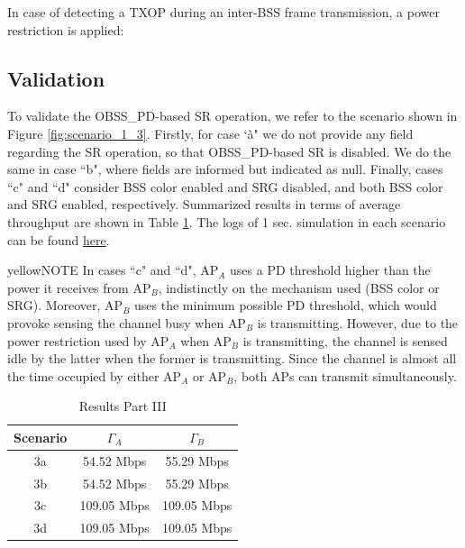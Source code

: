 \documentclass[]{article}
\begin{document}
	In case of detecting a TXOP during an inter-BSS frame transmission, a power restriction is applied:
		
	\subsection{Validation}
	
	To validate the OBSS\_PD-based SR operation, we refer to the scenario shown in Figure \ref{fig:scenario_1_3}. Firstly, for case `à" we do not provide any field regarding the SR operation, so that OBSS\_PD-based SR is disabled. We do the same in case ``b", where fields are informed but indicated as null. Finally, cases ``c" and ``d" consider BSS color enabled and SRG disabled, and both BSS color and SRG enabled, respectively. Summarized results in terms of average throughput are shown in Table \ref{tbl:results_part_3}. The logs of 1 sec. simulation in each scenario can be found \href{https://bitbucket.org/fwilhelmi/towards_centralized_spatial_reuse/src/master/IEEE\%20802.11ax\%20SR\%20implementation/Validations/3.\%20OBSS_PD\%20SR/}{here}. 
	
	\begin{mybox}{yellow}{NOTE}
		In cases ``c" and ``d", $\text{AP}_A$ uses a PD threshold higher than the power it receives from 	$\text{AP}_B$, indistinctly on the mechanism used (BSS color or SRG). Moreover, $\text{AP}_B$ uses the minimum possible PD threshold, which would provoke sensing the channel busy when $\text{AP}_B$ is transmitting. However, due to the power restriction used by $\text{AP}_A$ when $\text{AP}_B$ is transmitting, the channel is sensed idle by the latter when the former is transmitting. Since the channel is almost all the time occupied by either $\text{AP}_A$ or $\text{AP}_B$, both APs can transmit simultaneously.
	\end{mybox}	
	
	\begin{table}[]
		\centering
		\begin{tabular}{|c|c|c|}
			\hline
			\textbf{Scenario} & \textbf{$\Gamma_A$} & \textbf{$\Gamma_B$} \\ \hline
			3a & 54.52 Mbps & 55.29 Mbps  \\ \hline
			3b & 54.52 Mbps & 55.29 Mbps \\ \hline
			3c &  109.05 Mbps & 109.05 Mbps \\ \hline
			3d &  109.05 Mbps & 109.05 Mbps \\ \hline
		\end{tabular}
		\caption{Results Part III}
		\label{tbl:results_part_3}
	\end{table}
		
\end{document}
